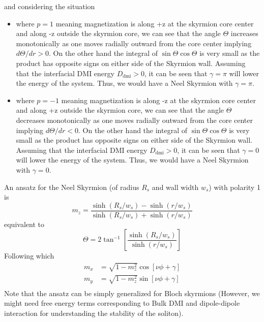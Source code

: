 \documentclass[aps,prb,onecolumn,notitlepage,showpacs,floatfix,superscriptaddress]{revtex4-1}
\newcommand{\mrm}[1]{\mathrm{#1}}
\begin{document}
and considering the situation 
\begin{itemize}
\item where $p=1$ meaning magnetization is along +z at the skyrmion core center and along -z outside the skyrmion core, we can see that the angle $\Theta$ increases monotonically as one moves radially outward from the core center implying $d\Theta/dr >0$. On the other hand the integral of $\sin\Theta \cos\Theta$ is very small as the product has opposite signs on either side of the Skyrmion wall. Assuming that the interfacial DMI energy $D_\mrm{dmi}>0$, it can be seen that $\gamma=\pi$ will lower the energy of the system. Thus, we would have a Neel Skyrmion with $\gamma=\pi$.
\item where $p=-1$ meaning magnetization is along -z at the skyrmion core center and along +z outside the skyrmion core, we can see that the angle $\Theta$ decreases monotonically as one moves radially outward from the core center implying $d\Theta/dr < 0$. On the other hand the integral of $\sin\Theta \cos\Theta$ is very small as the product has opposite signs on either side of the Skyrmion wall. Assuming that the interfacial DMI energy $D_\mrm{dmi}>0$, it can be seen that $\gamma=0$ will lower the energy of the system. Thus, we would have a Neel Skyrmion with $\gamma=0$.
\end{itemize}


\noindent An ansatz for the Neel Skyrmion (of radius $R_s$ and wall width $w_s$) with polarity 1 is
\begin{equation}
m_z = \dfrac{\sinh(R_s/w_s)-\sinh(r/w_s)}{\sinh(R_s/w_s)+\sinh(r/w_s)}
\end{equation}
equivalent to 
\begin{equation}
\Theta = 2 \tan^{-1} \left[ \dfrac{\sinh(R_s/w_s)}{\sinh(r/w_s)}\right]
\end{equation}
Following which
\begin{equation}
\begin{split}
m_x &= \sqrt{1-m_z^2} \cos[\nu \phi + \gamma] \\
m_y &= \sqrt{1-m_z^2} \sin[\nu \phi + \gamma] \\
\end{split}
\end{equation}
Note that the ansatz can be simply generalized for Bloch skyrmions (However, we might need free energy terms corresponding to Bulk DMI and dipole-dipole interaction for understanding the stability of the soliton).
%
\end{document}
